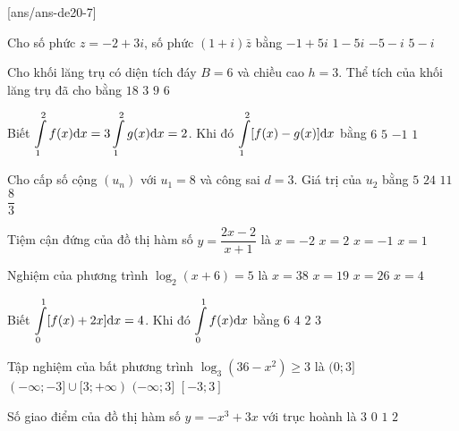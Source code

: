 
\begin{name}
	{\tenchude}
	{\tendethi}
	{\tentruong}
	{\thoigian}
\end{name}
[ans/ans-de20-7]

\begin{ex}%
Cho số phức $z=-2+3 i$, số phức $(1+i) \bar{z}$ bằng
\choice
{$-1+5 i$}
{\True $1-5 i$}
{$-5-i$}
{$5-i$}

\end{ex}
\begin{ex}%
Cho khối lăng trụ có diện tích đáy $B=6$ và chiều cao $h=3$. Thể tích của khối lăng trụ đã cho bằng
\choice
{\True $18$}
{$3$}
{$9$}
{$6$}

\end{ex}
\begin{ex}%
Biết $\displaystyle\displaystyle\int\limits_1^2 f(x) \mathrm{d} x=3\displaystyle\displaystyle\int\limits_1^2 g(x) \mathrm{d} x=2$. Khi đó $\displaystyle\displaystyle\int\limits_1^2[f(x)-g(x)] \mathrm{d} x$ bằng
\choice
{$6$}
{$5$}
{$-1$}
{\True $1$}

\end{ex}
\begin{ex}%
Cho cấp số cộng $\left(u_n\right)$ với $u_1=8$ và công sai $d=3$. Giá trị của $u_2$ bằng
\choice
{$5$}
{$24$}
{\True $11$}
{$\dfrac{8}{3}$}

\end{ex}
\begin{ex}%
Tiệm cận đứng của đồ thị hàm số $y=\dfrac{2 x-2}{x+1}$ là
\choice
{$x=-2$}
{$x=2$}
{\True $x=-1$}
{$x=1$}

\end{ex}
\begin{ex}%
Nghiệm của phương trình $\log_2(x+6)=5$ là
\choice
{$x=38$}
{$x=19$}
{\True $x=26$}
{$x=4$}

\end{ex}
\begin{ex}%
Biết $\displaystyle\displaystyle\int\limits_0^1[f(x)+2 x] \mathrm{d} x=4$. Khi đó $\displaystyle\displaystyle\int\limits_0^1 f(x) \mathrm{d} x$ bằng
\choice
{$6$}
{$4$}
{$2$}
{\True $3$}

\end{ex}
\begin{ex}%
Tập nghiệm của bất phương trình $\log_3\left(36-x^2\right) \geq 3$ là
\choice
{$(0; 3]$}
{$(-\infty;-3] \cup[3;+\infty)$}
{$(-\infty; 3]$}
{\True $[-3; 3]$}

\end{ex}
\begin{ex}%
Số giao điểm của đồ thị hàm số $y=-x^3+3 x$ với trục hoành là
\choice
{\True $3$}
{$0$}
{$1$}
{$2$}

\end{ex}
